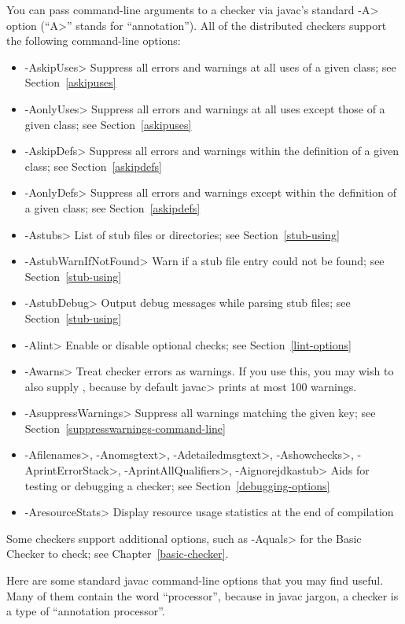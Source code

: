 You can pass command-line arguments to a checker via javac's standard \<-A>
option (``\<A>'' stands for ``annotation'').  All of the distributed
checkers support the following command-line options:

\begin{itemize}
\item \<-AskipUses> Suppress all errors and warnings at all uses of a
  given class; see Section~\ref{askipuses}
\item \<-AonlyUses> Suppress all errors and warnings at all uses except those of a
  given class; see Section~\ref{askipuses}
\item \<-AskipDefs> Suppress all errors and warnings within the definition of a
  given class; see Section~\ref{askipdefs}
\item \<-AonlyDefs> Suppress all errors and warnings except within the definition of a
  given class; see Section~\ref{askipdefs}
\item \<-Astubs> List of stub files or directories; see Section~\ref{stub-using}
\item \<-AstubWarnIfNotFound> Warn if a stub file entry could not be found; see Section~\ref{stub-using}
\item \<-AstubDebug> Output debug messages while parsing stub files; see Section~\ref{stub-using}
\item \<-Alint> Enable or disable optional checks; see Section~\ref{lint-options}
\item \<-Awarns> Treat checker errors as warnings.  If you use this, you
  may wish to also supply , because by default
  \<javac> prints at most 100 warnings.
\item \<-AsuppressWarnings> Suppress all warnings matching the given key; see
  Section~\ref{suppresswarnings-command-line}
\item \<-Afilenames>, \<-Anomsgtext>, \<-Adetailedmsgtext>, \<-Ashowchecks>, \<-AprintErrorStack>,
  \<-AprintAllQualifiers>, \<-Aignorejdkastub>
  Aids for testing or debugging a checker; see Section~\ref{debugging-options}
\item \<-AresourceStats> Display resource usage statistics at the end of compilation
\end{itemize}

\noindent
Some checkers support additional options, such as \<-Aquals> for the Basic
Checker to check; see Chapter~\ref{basic-checker}.


Here are some standard javac command-line options that you may find useful.
Many of them contain the word ``processor'', because in javac jargon, a
checker is a type of ``annotation processor''.

